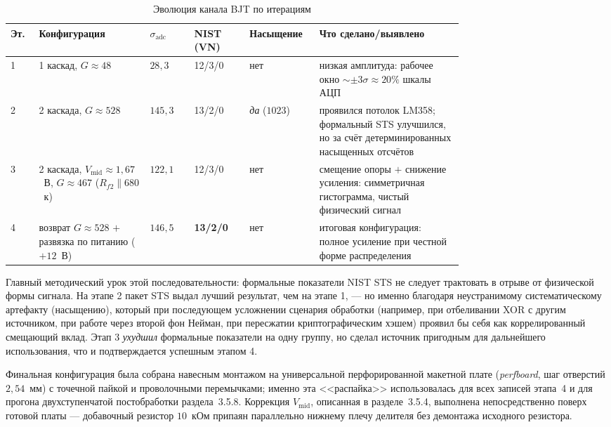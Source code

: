 \begin{table}[H]
  \centering
  \scriptsize
  \setlength{\tabcolsep}{3pt}
  \caption{Эволюция канала BJT по итерациям}
  \label{tab:bjt_evolution}
  \begin{tabular}{|p{0.04\linewidth}|p{0.20\linewidth}|p{0.08\linewidth}|p{0.10\linewidth}|p{0.07\linewidth}|p{0.26\linewidth}|}
    \hline
    Эт. & Конфигурация & $\sigma_\mathrm{adc}$ & NIST (VN) & Насы\-щение & Что сделано/выявлено \\
    \hline
    1 & 1 каскад, $G\!\approx\!48$ & $28{,}3$ & 12/3/0 & нет & низкая амплитуда: рабочее окно ${\sim}\pm 3\sigma\approx 20\%$ шкалы АЦП \\
    \hline
    2 & 2 каскада, $G\!\approx\!528$ & $145{,}3$ & 13/2/0 & \emph{да} ($1023$) & проявился потолок LM358; формальный STS улучшился, но за счёт детерминированных насыщенных отсчётов \\
    \hline
    3 & 2 каскада, $V_\mathrm{mid}\!\approx\!1{,}67$~В, $G\!\approx\!467$ ($R_{f2}\|680$~к) & $122{,}1$ & 12/3/0 & нет & смещение опоры $+$ снижение усиления: симметричная гистограмма, чистый физический сигнал \\
    \hline
    4 & возврат $G\!\approx\!528$ $+$ развязка по питанию ($+12$~В) & $146{,}5$ & \textbf{13/2/0} & нет & итоговая конфигурация: полное усиление при честной форме распределения \\
    \hline
  \end{tabular}
\end{table}

Главный методический урок этой последовательности: формальные показатели NIST STS
не следует трактовать в отрыве от физической формы сигнала. На этапе 2 пакет STS
выдал лучший результат, чем на этапе 1, --- но именно благодаря неустранимому
систематическому артефакту (насыщению), который при последующем усложнении сценария
обработки (например, при отбеливании XOR с другим источником, при работе через
второй фон Нейман, при пересжатии криптографическим хэшем) проявил бы себя как
коррелированный смещающий вклад. Этап 3 \emph{ухудшил} формальные показатели на одну
группу, но сделал источник пригодным для дальнейшего использования, что и
подтверждается успешным этапом 4.

Финальная конфигурация была собрана навесным монтажом на универсальной перфорированной
макетной плате (\textit{perfboard}, шаг отверстий $2{,}54$~мм) с точечной пайкой и
проволочными перемычками; именно эта <<распайка>> использовалась для всех записей
этапа~4 и для прогона двухступенчатой постобработки раздела~3.5.8. Коррекция
$V_\mathrm{mid}$, описанная в разделе~3.5.4, выполнена непосредственно поверх
готовой платы --- добавочный резистор $10$~кОм припаян параллельно нижнему плечу
делителя без демонтажа исходного резистора.


